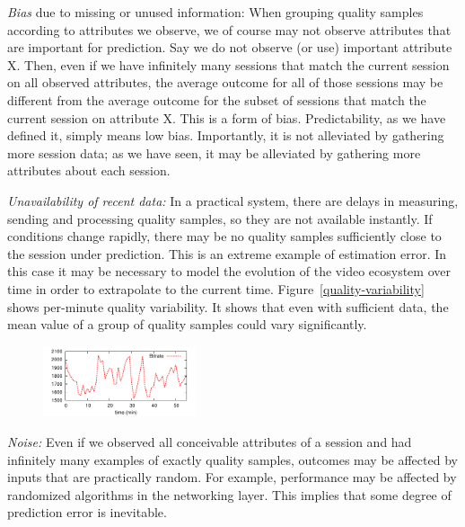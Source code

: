 \begin{packedenumerate}
  \item \emph{Bias} due to missing or unused information: When grouping quality samples according to attributes we observe, we of course may not observe attributes that are important for prediction.  Say we do not observe (or use) important attribute X.  Then, even if we have infinitely many sessions that match the current session on all observed attributes, the average outcome for all of those sessions may be different from the average outcome for the subset of sessions that match the current session on attribute X.  This is a form of bias.  Predictability, as we have defined it, simply means low bias.  Importantly, it is not alleviated by gathering more session data; as we have seen, it may be alleviated by gathering more attributes about each session.
  \item \emph{Unavailability of recent data:} In a practical system, there are delays in measuring, sending and processing quality samples, so they are not available instantly.  If conditions change rapidly, there may be no quality samples sufficiently close to the session under prediction.  This is an extreme example of estimation error.  In this case it may be necessary to model the evolution of the video ecosystem over time in order to extrapolate to the current time. Figure~\ref{quality-variability} shows per-minute quality variability. It shows that even with sufficient data, the mean value of a group of quality samples could vary significantly.

\begin{figure}[h!]
\centering
 \includegraphics[width=0.4\textwidth] {figures/quality-time.pdf}
\label{fig:quality-variability}
\end{figure}

  \item \emph{Noise:} Even if we observed all conceivable attributes of a session and had infinitely many examples of exactly quality samples, outcomes may be affected by inputs that are practically random.  For example, performance may be affected by randomized algorithms in the networking layer.  This implies that some degree of prediction error is inevitable.
\end{packedenumerate}

